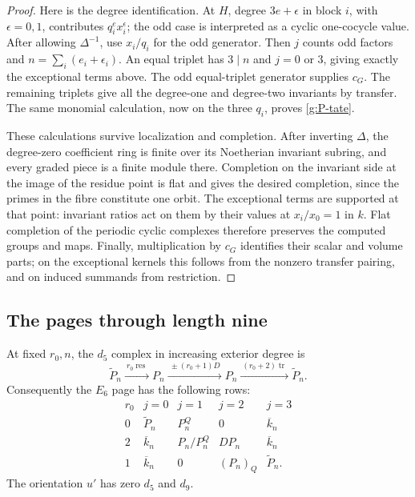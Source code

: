 \begin{proof}
Here is the degree identification.  At $H$, degree
$3e+\epsilon$ in block $i$, with $\epsilon=0,1$, contributes
$q_i^ex_i^\epsilon$; the odd case is interpreted as a cyclic
one-cocycle value.  After allowing $\Delta^{-1}$, use
$x_i/q_i$ for the odd generator.  Then $j$ counts odd factors
and $n=\sum_i(e_i+\epsilon_i)$.  An equal triplet has $3\mid n$
and $j=0$ or $3$, giving exactly the exceptional terms above.
The odd equal-triplet generator supplies $c_G$.
The remaining triplets give all the degree-one and degree-two
invariants by transfer.  The same monomial calculation, now on
the three $q_i$, proves \eqref{g:P-tate}.

These calculations survive localization and completion.  After
inverting $\Delta$, the degree-zero coefficient ring is finite
over its Noetherian invariant subring, and every graded piece is
a finite module there.  Completion on the invariant side at the
image of the residue point is flat and gives the desired
completion, since the primes in the fibre constitute one orbit.
The exceptional terms are supported at that point: invariant
ratios act on them by their values at $x_i/x_0=1$ in $k$.
Flat completion of the periodic cyclic complexes therefore
preserves the computed groups and maps.  Finally, multiplication
by $c_G$ identifies their scalar and volume parts; on the
exceptional kernels this follows from the nonzero transfer
pairing, and on induced summands from restriction.
\end{proof}

\subsection{The pages through length nine}

\begin{lemma}\label{g:early-pages}
At fixed $r_0,n$, the $d_5$ complex in increasing exterior degree is
\begin{equation}\label{g:d5-complex}
 \widetilde P_n\xrightarrow{\ r_0\operatorname{res}\ }P_n
 \xrightarrow{\ \pm(r_0+1)D\ }P_n
 \xrightarrow{\ (r_0+2)\operatorname{tr}\ }\widetilde P_n.
\end{equation}
Consequently the $E_6$ page has the following rows:
\begin{equation}\label{g:E6}
\begin{array}{c|cccc}
 r_0&j=0&j=1&j=2&j=3\\\hline
 0&\widetilde P_n&P_n^Q&0&\overline k_n\\
 2&\overline k_n&P_n/P_n^Q&DP_n&\overline k_n\\
 1&\overline k_n&0&(P_n)_Q&\widetilde P_n.
\end{array}
\end{equation}
The orientation $u'$ has zero $d_5$ and $d_9$.
\end{lemma}

